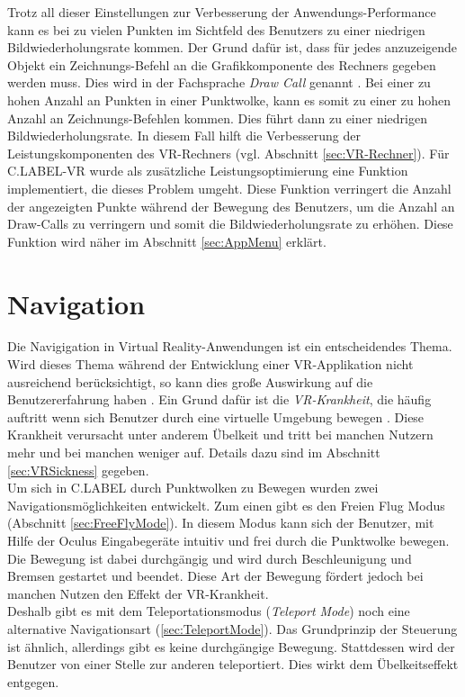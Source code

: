 Trotz all dieser Einstellungen zur Verbesserung der Anwendungs-Performance kann es bei zu vielen Punkten im Sichtfeld des Benutzers zu einer niedrigen Bildwiederholungsrate kommen. Der Grund dafür ist, dass für jedes anzuzeigende Objekt ein Zeichnungs-Befehl an die Grafikkomponente des Rechners gegeben werden muss. Dies wird in der Fachsprache \textit{Draw Call} genannt \cite{bib:DrawCall}. Bei einer zu hohen Anzahl an Punkten in einer Punktwolke, kann es somit zu einer zu hohen Anzahl an Zeichnungs-Befehlen kommen. Dies führt dann zu einer niedrigen Bildwiederholungsrate. In diesem Fall hilft die Verbesserung der Leistungskomponenten des VR-Rechners (vgl. Abschnitt \ref{sec:VR-Rechner}). Für C.LABEL-VR wurde als zusätzliche Leistungsoptimierung eine Funktion implementiert, die dieses Problem umgeht. Diese Funktion verringert die Anzahl der angezeigten Punkte während der Bewegung des Benutzers, um die Anzahl an Draw-Calls zu verringern und somit die Bildwiederholungsrate zu erhöhen. Diese Funktion wird näher im Abschnitt \ref{sec:AppMenu} erklärt. 

\section{Navigation}
\label{sec:Navigation}
Die Navigigation in Virtual Reality-Anwendungen ist ein entscheidendes Thema. Wird dieses Thema während der Entwicklung einer VR-Applikation nicht ausreichend berücksichtigt, so kann dies große Auswirkung auf die Benutzererfahrung haben \cite{bib:PointTeleport}. Ein Grund dafür ist die \textit{VR-Krankheit}, die häufig auftritt wenn sich Benutzer durch eine virtuelle Umgebung bewegen \cite{bib:VRSicknessLaviola}. Diese Krankheit verursacht unter anderem Übelkeit und tritt bei manchen Nutzern mehr und bei manchen weniger auf. Details dazu sind im Abschnitt \ref{sec:VRSickness} gegeben. \\

Um sich in C.LABEL durch Punktwolken zu Bewegen wurden zwei Navigationsmöglichkeiten entwickelt. Zum einen gibt es den Freien Flug Modus (Abschnitt \ref{sec:FreeFlyMode}). In diesem Modus kann sich der Benutzer, mit Hilfe der Oculus Eingabegeräte intuitiv und frei durch die Punktwolke bewegen. Die Bewegung ist dabei durchgängig und wird durch Beschleunigung und Bremsen gestartet und beendet. Diese Art der Bewegung fördert jedoch bei manchen Nutzen den Effekt der VR-Krankheit.\\

Deshalb gibt es mit dem Teleportationsmodus (\textit{Teleport Mode}) noch eine alternative Navigationsart (\ref{sec:TeleportMode}). Das Grundprinzip der Steuerung ist ähnlich, allerdings gibt es keine durchgängige Bewegung. Stattdessen wird der Benutzer von einer Stelle zur anderen teleportiert. Dies wirkt dem Übelkeitseffekt entgegen.   

